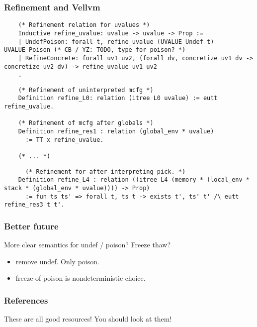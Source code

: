 \documentclass[handout]{beamer}
\begin{document}
\begin{frame}[fragile]
  \frametitle{Refinement and Vellvm}

\begin{verbatim}
    (* Refinement relation for uvalues *)
    Inductive refine_uvalue: uvalue -> uvalue -> Prop :=
    | UndefPoison: forall t, refine_uvalue (UVALUE_Undef t) UVALUE_Poison (* CB / YZ: TODO, type for poison? *)
    | RefineConcrete: forall uv1 uv2, (forall dv, concretize uv1 dv -> concretize uv2 dv) -> refine_uvalue uv1 uv2
    .
\end{verbatim}

  \pause
  
\begin{verbatim}
    (* Refinement of uninterpreted mcfg *)
    Definition refine_L0: relation (itree L0 uvalue) := eutt refine_uvalue.

    (* Refinement of mcfg after globals *)
    Definition refine_res1 : relation (global_env * uvalue)
      := TT x refine_uvalue.

    (* ... *)
\end{verbatim}

  \pause

\begin{verbatim}
      (* Refinement for after interpreting pick. *)
    Definition refine_L4 : relation ((itree L4 (memory * (local_env * stack * (global_env * uvalue)))) -> Prop)
      := fun ts ts' => forall t, ts t -> exists t', ts' t' /\ eutt refine_res3 t t'.
\end{verbatim}

\end{frame}

\begin{frame}
  \frametitle{Better future}

  More clear semantics for undef / poison? Freeze thaw?

  \begin{itemize}
  \item remove undef. Only poison.
  \item freeze of poison is nondeterministic choice.
  \end{itemize}
\end{frame}

  \begin{frame}
    \frametitle{References}

  \nocite{*}
  \printbibliography

  These are all good resources! You should look at them!
\end{frame}
\end{document}
